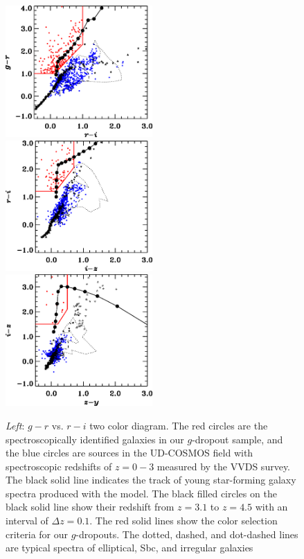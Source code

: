 \documentclass[]{pasj01}
\begin{document}
\begin{figure}
 \begin{center}
  \includegraphics[width=5.6cm]{color_color_gri.eps} 
  \includegraphics[width=5.6cm]{color_color_riz.eps} 
  \includegraphics[width=5.6cm]{color_color_izy.eps} 
 \end{center}
\caption{
\textit{Left}: $g - r$ vs. $r - i$ two color diagram. 
The red circles are the spectroscopically identified galaxies in our $g$-dropout sample, 
and the blue circles are sources in the UD-COSMOS field 
with spectroscopic redshifts of $z = 0-3$ measured by the VVDS survey.
The black solid line indicates the track of young star-forming galaxy spectra 
produced with the \citet{2003MNRAS.344.1000B} model. 
The black filled circles on the black solid line show their redshift 
from $z=3.1$ to $z=4.5$ 
with an interval of $\Delta z = 0.1$. 
The red solid lines show the color selection criteria for our $g$-dropouts. 
The dotted, dashed, and dot-dashed lines are 
typical spectra of elliptical, Sbc, and irregular galaxies 
}
\end{figure}
\end{document}

